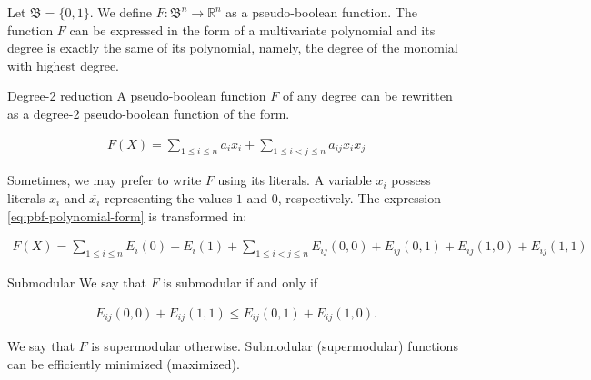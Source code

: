 Let $\mathfrak{B}=\{0,1\}$. We define $F:\mathfrak{B}^n\rightarrow \mathbb{R}^n$ as a pseudo-boolean function. The function $F$ can be expressed in the form of a multivariate polynomial and its degree is exactly the same of its polynomial, namely, the degree of the monomial with highest degree.

\begin{claim}{Degree-2 reduction}
	A pseudo-boolean function $F$ of any degree can be rewritten as a degree-2 pseudo-boolean function of the form.	
	
\begin{align}\label{eq:pbf-polynomial-form}
	F(X) = \sum_{1\leq i\leq n}{a_ix_i} + \sum_{1 \leq i < j \leq n}{a_{ij}x_ix_j}	
\end{align}	
	
\end{claim}

Sometimes, we may prefer to write $F$ using its literals. A variable $x_i$ possess literals $x_i$ and $\overline{x_i}$ representing the values $1$ and $0$, respectively. The expression \eqref{eq:pbf-polynomial-form} is transformed in:

\begin{align}
	F(X) = \sum_{1\leq i\leq n}{E_i(0) + E_i(1)} + \sum_{1 \leq i < j \leq n}{E_{ij}(0,0) + E_{ij}(0,1) + E_{ij}(1,0) + E_{ij}(1,1)}
\end{align}


\begin{claim}{Submodular} \label{claim:submodular}
 We say that $F$ is submodular if and only if 
 
 \begin{align*}
	E_{ij}(0,0) + E_{ij}(1,1) \leq E_{ij}(0,1) + E_{ij}(1,0).
 \end{align*}
\end{claim}

We say that $F$ is supermodular otherwise. Submodular (supermodular) functions can be efficiently minimized (maximized).

%
%

